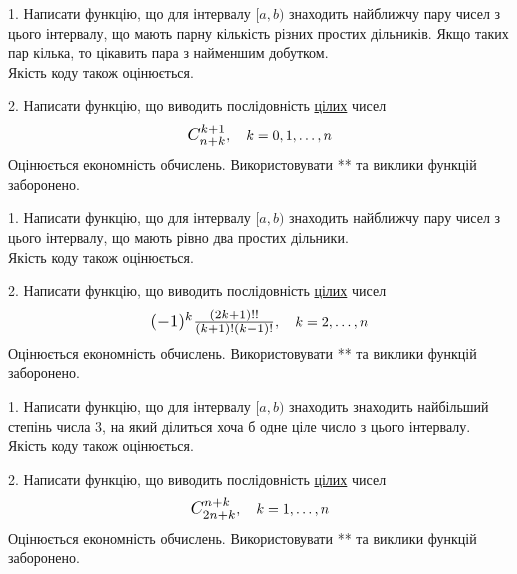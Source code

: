 \documentclass[12pt, ukrainian]{article}
\begin{document}



\begin {Large}
1. Написати функцію, що для інтервалу $[a, b)$ знаходить найближчу пару чисел з цього інтервалу, що мають парну кількість різних простих дільників. Якщо таких пар кілька, то цікавить пара з найменшим добутком.\\	Якість коду також оцінюється. 



\vspace{10mm}

\newpage

2. 
Написати функцію, що виводить послідовність \underline{цілих} чисел
$$\scalebox{1.2}{$C_{n+k}^{k+1}$}, \quad k=0,1,\ldots,n$$
Оцінюється економність обчислень. Використовувати ** та виклики функцій заборонено.

\end {Large}\newpage




\begin {Large}
1. Написати функцію, що для інтервалу $[a, b)$ знаходить найближчу пару чисел з цього інтервалу, що мають рівно два простих дільники.\\	Якість коду також оцінюється. 



\vspace{10mm}

\newpage

2. 
Написати функцію, що виводить послідовність \underline{цілих} чисел
$$\scalebox{1.2}{$(-1)^{k}\frac{(2k+1)!!}{(k+1)!(k-1)!}$}, \quad k=2,\ldots,n$$
Оцінюється економність обчислень. Використовувати ** та виклики функцій заборонено.

\end {Large}\newpage




\begin {Large}
1. Написати функцію, що для інтервалу $[a, b)$ знаходить знаходить найбільший степінь числа 3, на який ділиться хоча б одне ціле число з цього інтервалу.\\	Якість коду також оцінюється. 



\vspace{10mm}

\newpage

2. 
Написати функцію, що виводить послідовність \underline{цілих} чисел
$$\scalebox{1.2}{$C_{2n+k}^{n+k}$}, \quad k=1,\ldots,n$$
Оцінюється економність обчислень. Використовувати ** та виклики функцій заборонено.

\end {Large}\newpage
\end{document}
